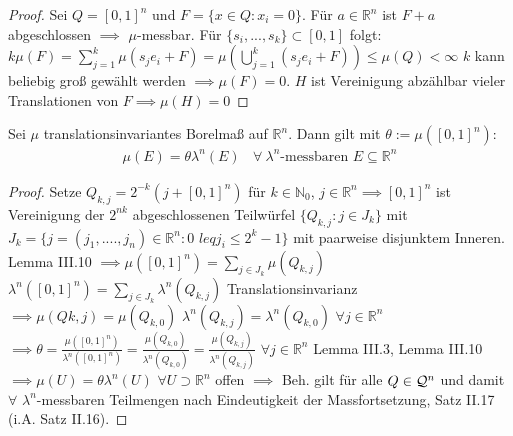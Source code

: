 \documentclass[11pt,a4paper,fleqn,openany]{report}
\begin{document}
    \begin{proof}
      Sei $Q = [0,1]^n$ und $F = \{x\in Q: x_i = 0\}$. Für $a\in\mathbb{R}^n$ ist $F+a$ abgeschlossen $\implies$ $\mu$-messbar. Für $\{s_i, ..., s_k\} \subset [0,1]$ folgt: \newline $k\mu(F) = \sum\limits_{j=1}^{k}\mu(s_j e_i + F) = \mu(\bigcup\limits_{j=1}^{k}(s_j e_i + F)) \leq \mu(Q) < \infty$  \newline
      $k$ kann beliebig groß gewählt werden $\implies \mu(F) = 0$. \newline
      $H$ ist Vereinigung abzählbar vieler Translationen von $F \implies \mu(H) = 0$
    \end{proof}

    \begin{theorem}
      Sei $\mu$ translationsinvariantes Borelmaß auf $\mathbb{R}^n$. Dann gilt mit $\theta := \mu([0,1]^n)$:
      \begin{align*}
        \mu(E) = \theta \lambda^n(E) \ \ \ \ \forall \ \lambda^n \text{-messbaren } E \subseteq \mathbb{R}^n
      \end{align*}
    \end{theorem}

    \begin{proof}
      Setze $Q_{k,j} = 2^{-k}(j+[0,1]^n)$ für $k\in\mathbb{N}_0$, $j\in\mathbb{R}^n \implies [0,1]^n$ ist Vereinigung der $2^{nk}$ abgeschlossenen Teilwürfel $\{Q_{k,j}: j\in J_k\}$ mit $J_k = \{j = (j_1, ...., j_n) \in \mathbb{R}^n: 0$ $leq j_i \leq 2^k-1\}$ mit paarweise disjunktem Inneren. Lemma III.10 \newline  $\implies \mu([0,1]^n) = \sum\limits_{j\in J_k} \mu(Q_{k,j})$ \newline
      $\lambda^n([0,1]^n) = \sum\limits_{j\in J_k} \lambda^n(Q_{k,j})$ \newline
      Translationsinvarianz $\implies \mu(Q{k,j}) = \mu(Q_{k,0})$ \newline
      $\lambda^n(Q_{k,j}) = \lambda^n(Q_{k,0})$ $\forall  j\in \mathbb{R}^n$ \newline
      $\implies \theta = \frac{\mu([0,1]^n)}{\lambda^n([0,1]^n)} = \frac{\mu(Q_{k,0})}{\lambda^n(Q_{k,0})} = \frac{\mu(Q_{k,j})}{\lambda^n(Q_{k,j})}$ $\forall j\in \mathbb{R}^n$ \newline
      Lemma III.3, Lemma III.10 $\implies \mu(U) = \theta \lambda^n(U)$ $\forall U\supset \mathbb{R}^n$ offen \newline
      $\implies$ Beh. gilt für alle $Q \in \mathcal{Q}^n$ und damit $\forall$ $\lambda^n$-messbaren Teilmengen nach Eindeutigkeit der Massfortsetzung, Satz II.17 (i.A. Satz II.16). 
    \end{proof}
\end{document}
